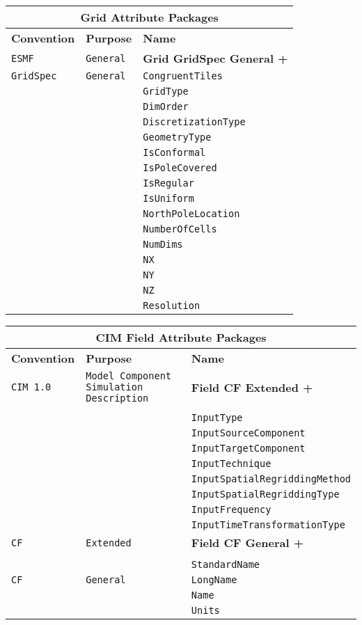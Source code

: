 \begin{tabular}{|p{4cm}|p{4cm}|p{6cm}|}
\hline
\multicolumn{3}{|c|}{{\bf \large Grid Attribute Packages}} \\
\hline\hline
{\bf Convention} & {\bf Purpose} & {\bf Name} \\
\hline\hline
{\tt ESMF} & {\tt General} & {\bf Grid GridSpec General +} \\
{\tt GridSpec} & {\tt General} & {\tt CongruentTiles} \\
 & & {\tt GridType} \\ 
 & & {\tt DimOrder} \\ 
 & & {\tt DiscretizationType} \\ 
 & & {\tt GeometryType} \\ 
 & & {\tt IsConformal} \\ 
 & & {\tt IsPoleCovered} \\ 
 & & {\tt IsRegular} \\ 
 & & {\tt IsUniform} \\ 
 & & {\tt NorthPoleLocation} \\ 
 & & {\tt NumberOfCells} \\ 
 & & {\tt NumDims} \\ 
 & & {\tt NX} \\ 
 & & {\tt NY} \\ 
 & & {\tt NZ} \\ 
 & & {\tt Resolution} \\ 
\hline
\end{tabular}
\label{GridAttributePackages}

\vspace{18pt}

\begin{tabular}{|p{4cm}|p{4cm}|p{6cm}|}
\hline
\multicolumn{3}{|c|}{{\bf \large CIM Field Attribute Packages}} \\
\hline\hline
{\bf Convention} & {\bf Purpose} & {\bf Name} \\
\hline\hline
{\tt CIM 1.0} & {\tt Model Component Simulation Description} & {\bf Field CF Extended +} \\
& & \\
& & {\tt InputType}  \\
 & & {\tt InputSourceComponent} \\ 
 & & {\tt InputTargetComponent} \\ 
 & & {\tt InputTechnique} \\ 
 & & {\tt InputSpatialRegriddingMethod} \\ 
 & & {\tt InputSpatialRegriddingType} \\ 
 & & {\tt InputFrequency} \\ 
 & & {\tt InputTimeTransformationType} \\ 
\hline
{\tt CF} & {\tt Extended} & {\bf Field CF General +} \\
& & \\
& & {\tt StandardName}\\ 
\hline
{\tt CF} & {\tt General} & {\tt LongName}\\
     & & {\tt Name} \\
     & & {\tt Units}  \\
\hline
\end{tabular}
\label{FieldAttributePackages}


